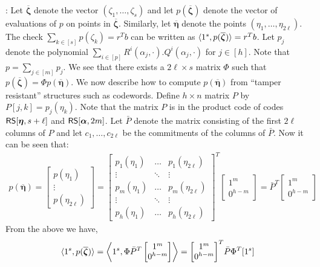 : Let $\overline{\bm{\zeta}}$ denote the vector $(\zeta_1,\ldots,\zeta_s)$ and let $p(\overline{\bm{\zeta}})$ denote the vector of
evaluations of $p$ on points in $\overline{\bm{\zeta}}$. Similarly, let $\overline{\bm{\eta}}$ denote
the points $(\eta_1,\ldots,\eta_{2\ell})$. The check $\sum_{k\in
[s]}p(\zeta_k)=r^Tb$ can be written as $\langle 1^s,p(\overline{\bm{\zeta}})\rangle=r^Tb$. 
Let $p_j$ denote the polynomial $\sum_{i\in
[p]}R^i(\alpha_j,\cdot).Q^i(\alpha_j,\cdot)$ for $j\in [h]$. Note that
$p=\sum_{j\in [m]}p_j$. We see that there exists a $2\ell\times s$ matrix
$\Phi$ such that $p(\overline{\bm{\zeta}})=\Phi p(\overline{\bm{\eta}})$. We now describe
how to compute $p(\overline{\bm{\eta}})$ from ``tamper resistant'' structures
such as codewords. Define $h\times n$ matrix $P$ by $P[j,k]=p_j(\eta_k)$. Note
that the matrix $P$ is in the product code of codes $\mathsf{RS}[\bm{\eta},s+\ell]$ and
$\mathsf{RS}[\bm{\alpha},2m]$. Let $\bar{P}$ denote the matrix consisting of the first
$2\ell$ columns of $P$ and let $c_1,\ldots,c_{2\ell}$ be the commitments of the
columns of $\bar{P}$. Now it can be seen that:
\begin{align}
p(\overline{\bm{\eta}}) = \begin{bmatrix} p(\eta_1) \\ \vdots \\
p(\eta_{2\ell}) \end{bmatrix} = 
	{\begin{bmatrix}
	p_1(\eta_1) & \hdots & p_1(\eta_{2\ell}) \\
	\vdots & \ddots & \vdots \\
	p_m(\eta_1) & \hdots & p_m(\eta_{2\ell}) \\
	\vdots & \ddots & \vdots \\
	p_h(\eta_1) & \hdots & p_h(\eta_{2\ell})
	\end{bmatrix}}^T
	\begin{bmatrix}
	1^m \\
	0^{h-m}
	\end{bmatrix}=\bar{P}^T\begin{bmatrix} 1^m \\ 0^{h-m}\end{bmatrix}
\end{align}
From the above we have, 
\begin{align}\label{eq:necessarycondlin}
\langle 1^s,p(\overline{\bm{\zeta}})\rangle = \left\langle 1^s, \Phi\bar{P}^T\begin{bmatrix}
1^m \\ 0^{h-m} \end{bmatrix}\right\rangle = {\begin{bmatrix} 1^m \\ 0^{h-m}
\end{bmatrix}}^T\bar{P}\Phi^T[1^s]
\end{align}
